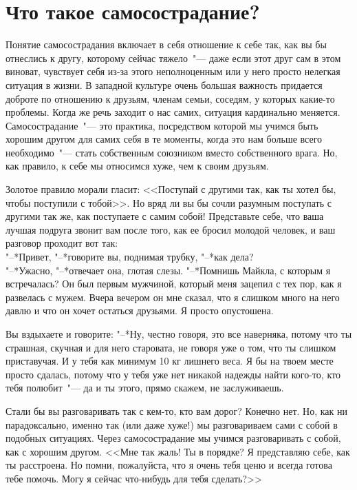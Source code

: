 
\chapter{Что такое самосострадание?} \label{What_is_self-compassion}

Понятие самосострадания включает в себя отношение к себе так, как вы бы отнеслись к другу, которому сейчас тяжело~"--- даже если этот друг сам в этом виноват,  чувствует себя из-за этого неполноценным или у него просто нелегкая ситуация в жизни. В западной культуре очень большая важность придается доброте по отношению к друзьям, членам семьи, соседям, у которых какие-то проблемы. Когда же речь заходит о нас самих, ситуация кардинально меняется. Самосострадание~"--- это практика, посредством которой мы учимся быть хорошим другом для самих себя в те моменты, когда это нам больше всего необходимо~"--- стать собственным союзником вместо собственного врага. Но, как правило, к себе мы относимся хуже, чем к своим друзьям.

Золотое правило морали гласит: <<Поступай с другими так, как ты хотел бы, чтобы поступили с тобой>>. Но вряд ли вы бы сочли разумным поступать с другими так же, как поступаете с самим собой! Представьте себе, что ваша лучшая подруга звонит вам после того, как ее бросил молодой человек, и ваш разговор проходит вот так:\\
"--*Привет, "--*говорите вы, поднимая трубку, "--*как дела?\\
"--*Ужасно, "--*отвечает она, глотая слезы. "--*Помнишь Майкла, с которым я встречалась? Он был первым мужчиной, который меня зацепил с тех пор, как я развелась с мужем. Вчера вечером он мне сказал, что я слишком много на него давлю и что он хочет остаться друзьями. Я просто опустошена.

Вы вздыхаете и говорите:
"--*Ну, честно говоря, это все наверняка, потому что ты страшная, скучная и для него старовата, не говоря уже о том, что ты слишком приставучая. И у тебя как минимум 10 кг лишнего веса. Я бы на твоем месте просто сдалась, потому что у тебя уже нет никакой надежды найти кого-то, кто тебя полюбит~"--- да и ты этого, прямо скажем, не заслуживаешь.

Стали бы вы разговаривать так с кем-то, кто вам дорог? Конечно нет. Но, как ни парадоксально, именно так (или даже хуже!) мы разговариваем сами с собой в подобных ситуациях. Через самосострадание мы учимся разговаривать с собой, как с хорошим другом. <<Мне так жаль! Ты в порядке? Я представляю себе, как ты расстроена. Но помни, пожалуйста, что я очень тебя ценю и всегда готова тебе помочь. Могу я сейчас что-нибудь для тебя сделать?>>

